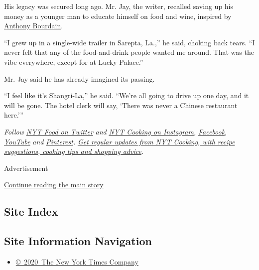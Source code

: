 His legacy was secured long ago. Mr. Jay, the writer, recalled saving up
his money as a younger man to educate himself on food and wine, inspired
by
\href{https://www.theringer.com/pop-culture/2020/7/14/21323748/anthony-bourdain-kitchen-confidential-book-20-year-anniversary}{Anthony
Bourdain}.

``I grew up in a single-wide trailer in Sarepta, La.,'' he said, choking
back tears. ``I never felt that any of the food-and-drink people wanted
me around. That was the vibe everywhere, except for at Lucky Palace.''

Mr. Jay said he has already imagined its passing.

``I feel like it's Shangri-La,'' he said. ``We're all going to drive up
one day, and it will be gone. The hotel clerk will say, `There was never
a Chinese restaurant here.'''

\emph{Follow} \href{https://twitter.com/nytfood}{\emph{NYT Food on
Twitter}} \emph{and}
\href{https://www.instagram.com/nytcooking/}{\emph{NYT Cooking on
Instagram}}\emph{,}
\href{https://www.facebookcorewwwi.onion/nytcooking/}{\emph{Facebook}}\emph{,}
\href{https://www.youtube.com/nytcooking}{\emph{YouTube}} \emph{and}
\href{https://www.pinterest.com/nytcooking/}{\emph{Pinterest}}\emph{.}
\href{https://www.nytimes3xbfgragh.onion/newsletters/cooking}{\emph{Get
regular updates from NYT Cooking, with recipe suggestions, cooking tips
and shopping advice}}\emph{.}

Advertisement

\protect\hyperlink{after-bottom}{Continue reading the main story}

\hypertarget{site-index}{%
\subsection{Site Index}\label{site-index}}

\hypertarget{site-information-navigation}{%
\subsection{Site Information
Navigation}\label{site-information-navigation}}

\begin{itemize}
\tightlist
\item
  \href{https://help.nytimes3xbfgragh.onion/hc/en-us/articles/115014792127-Copyright-notice}{©~2020~The
  New York Times Company}
\end{itemize}

